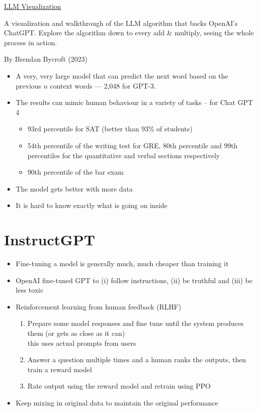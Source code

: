 \documentclass[25pt,a4paper,landscape,headrule,footrule,xetex]{foils}
\begin{document}

\href{https://bbycroft.net/llm}{LLM Visualization}

A visualization and walkthrough of the LLM algorithm that backs OpenAI's ChatGPT. Explore the algorithm down to every add \& multiply, seeing the whole process in action.

By Brendan Bycroft (2023)


\begin{itemize}
\item A very, very large model that can predict the next word based on the previous $n$ context words --- 2,048 for GPT-3.
\item The results can mimic human behaviour in a variety of tasks -- for Chat GPT 4
  \begin{itemize}
  \item 93rd percentile for SAT (better than 93\% of students)
  \item 54th percentile of the writing test for GRE, 80th percentile
    and 99th percentiles for the quantitative and verbal sections
    respectively
  \item 90th percentile of the bar exam 
  \end{itemize}
\item The model gets better with more data
\item It is hard to know exactly what is going on inside
\end{itemize}

\section{InstructGPT}


\begin{itemize}
\item Fine-tuning a model is generally much, much cheaper than training it
\item OpenAI fine-tuned GPT to (i) follow instructions, (ii) be truthful and (iii) be less toxic
\item  Reinforcement learning from  human feedback (RLHF)
  \begin{enumerate}
  \item Prepare some model responses and fine tune until the system
    produces them (or gets as close as it can)
    \\ this uses actual prompts from users
  \item Answer a question multiple times and a human ranks the
    outputs, then train a reward model 
  \item Rate output using the reward model and retrain using PPO
  \end{enumerate}
\item  Keep mixing in original data to maintain the original performance
    
\end{itemize}
\end{document}

